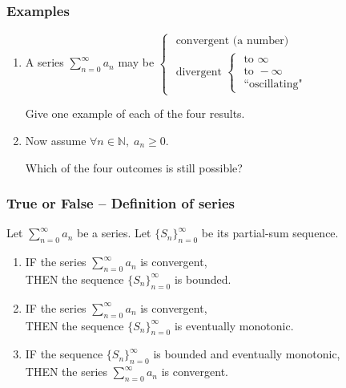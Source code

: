 \documentclass[14pt]{beamer}
\newcommand{\N}{\mathbb{N}}
\newcommand{\p}{\pause}
\newcommand{\azul}[1]{{\color{blue} #1}}
\newcommand{\rojo}[1]{{\color{red} #1}}
\newcommand{\setsize}[1]{\fontsize{#1}{#1}\selectfont} %
\newcommand{\vv}{\vspace{.5cm}}
\begin{document}
	\begin{frame}[t]
		\frametitle{Examples}

		\begin{enumerate}
			\item A series ${\displaystyle \sum_{n=0}^{\infty} a_n}$ may be ${\displaystyle  \begin{cases}\mbox{ convergent (a number) } \\ \mbox{ divergent } \begin{cases}\mbox{ to } \infty \\ \mbox{ to } - \infty \\ \mbox{ ``oscillating"}\end{cases}\end{cases} }$
				\vv

				Give one example of each of the four results. \vv \p

			\item Now assume ${\displaystyle \forall n \in \N, \; a_n \geq 0}$.

				Which of the four outcomes is still possible?
		\end{enumerate}
	\end{frame}
	\begin{frame}[t]
		\setsize{12}
		\frametitle{True or False -- Definition of series}

		Let ${\displaystyle \sum_{n=0}^{\infty} a_n}$ be a series. Let
		${\displaystyle \{ S_n \}_{n=0}^{\infty}}$ be its partial-sum sequence.

		\begin{enumerate}
			\item IF \azul{the series ${\displaystyle \sum_{n=0}^{\infty} a_n}$ is convergent},
				\\ THEN \rojo{the sequence ${\displaystyle \{ S_n \}_{n=0}^{\infty}}$ is bounded}.
				\vspace{.5cm}

			\item IF \azul{the series ${\displaystyle \sum_{n=0}^{\infty} a_n}$ is convergent},
				\\ THEN \rojo{the sequence ${\displaystyle \{ S_n \}_{n=0}^{\infty}}$ is eventually monotonic}.
				\vspace{.8cm}

			\item IF \rojo{the sequence ${\displaystyle \{ S_n \}_{n=0}^{\infty}}$ is bounded and eventually monotonic},
				\\ THEN \azul{the series ${\displaystyle \sum_{n=0}^{\infty} a_n}$ is convergent}.
		\end{enumerate}
	\end{frame}
\end{document}
